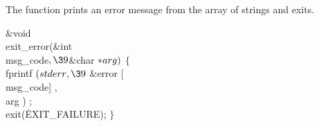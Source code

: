 The function prints an error message from the array of 
strings and
exits.

\Y\B\&{void} \\{exit\_error}(\&{int} \\{msg\_code}${},\39{}$\&{char} ${}{*}%
\\{arg}){}$\1\1 $\{$ \\{fprintf} $(\\{stderr},\39$ \&{error} [\\{msg\_code}]
$,$ \\{arg} )  ;\6
\\{exit}(\.{EXIT\_FAILURE}); $\}{}$\par
\fi


\inx
\fin
\con
